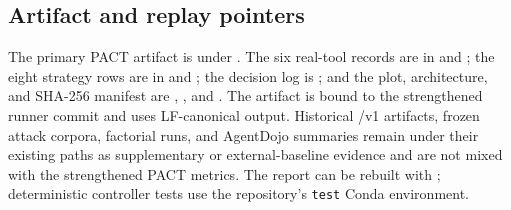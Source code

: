 \documentclass[journal]{IEEEtran}
\begin{document}
\subsection*{Artifact and replay pointers}

The primary PACT artifact is under
.  The six real-tool records are in
 and ; the eight strategy rows are
in  and ; the decision
log is ; and the plot, architecture, and SHA-256
manifest are , , and
.  The artifact is bound to the strengthened runner commit
and uses LF-canonical output.  Historical /v1 artifacts,
frozen attack corpora, factorial runs, and AgentDojo summaries remain under
their existing paths as supplementary or external-baseline evidence and are not
mixed with the strengthened PACT metrics.  The report can be rebuilt with
; deterministic controller tests use the
repository's \texttt{test} Conda environment.
\end{document}
